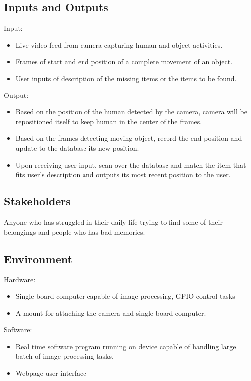 \documentclass{article}
\begin{document}
\subsection{Inputs and Outputs}
Input:
\begin{itemize}
    \item Live video feed from camera capturing human and object activities. 
    \item Frames of start and end position of a complete movement of an object.
    \item User inputs of description of the missing items or the items to be found.
\end{itemize}
Output:
\begin{itemize}
    \item Based on the position of the human detected by the camera, camera will be repositioned itself to keep human in the center of the frames.
    \item Based on the frames detecting moving object, record the end position and update to the database its new position.
    \item Upon receiving user input, scan over the database and match the item that fits user's description and outputs its most recent position to the user.
\end{itemize}
\subsection{Stakeholders}
Anyone who has struggled in their daily life trying to find some of their belongings and people who has bad memories.
\subsection{Environment}

Hardware:
\begin{itemize}
    \item Single board computer capable of image processing, GPIO control tasks
    \item A mount for attaching the camera and single board computer.
\end{itemize}
Software:
\begin{itemize}
    \item Real time software program running on device capable of handling large batch of image processing tasks.
    \item Webpage user interface

\end{itemize}
\end{document}
